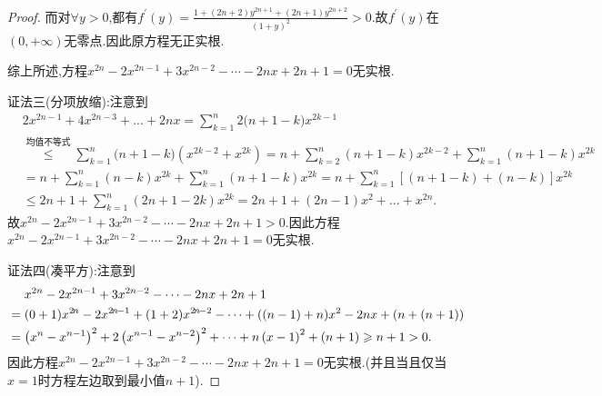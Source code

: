 \documentclass[lang=cn,newtx,10pt,scheme=chinese]{elegantbook}
\begin{document}
\begin{proof}
    而对\(\forall y > 0\),都有\(f^{\prime}(y) = \frac{1 + (2n + 2)y^{2n + 1} + (2n + 1)y^{2n + 2}}{(1 + y)^2} > 0\).故\(f^{\prime}(y)\)在\((0, +\infty)\)无零点.因此原方程无正实根.

    综上所述,方程\(x^{2n} - 2x^{2n - 1} + 3x^{2n - 2} - \cdots - 2nx + 2n + 1 = 0\)无实根.

    {\color{blue}证法三(分项放缩):}注意到
    \begin{align*}
        &2x^{2n-1}+4x^{2n-3}+...+2nx=\sum_{k=1}^n{2(n}+1-k)x^{2k-1}
        \\
        &\overset{\hyperref[note:1.1111]{\text{均值不等式}}}{\leqslant}\sum_{k=1}^n{(n}+1-k)\left( x^{2k-2}+x^{2k} \right) =n+\sum_{k=2}^n{(n+1-k)x^{2k-2}}+\sum_{k=1}^n{(n+1-k)x^{2k}}
        \\
        &=n+\sum_{k=1}^n{(n-k)x^{2k}}+\sum_{k=1}^n{(n+1-k)x^{2k}}=n+\sum_{k=1}^n{\left[ (n+1-k)+(n-k) \right] x^{2k}}
        \\
        &\leqslant 2n+1+\sum_{k=1}^n{(2n+1-2k)x^{2k}}=2n+1+(2n-1)x^2+...+x^{2n}.
    \end{align*}
    故\(x^{2n} - 2x^{2n - 1} + 3x^{2n - 2} - \cdots - 2nx + 2n + 1 > 0\).因此方程\(x^{2n} - 2x^{2n - 1} + 3x^{2n - 2} - \cdots - 2nx + 2n + 1 = 0\)无实根.

    {\color{blue}证法四(凑平方):}注意到
    \begin{align*}\label{eq:别样的凑平方技巧}
        &\,\,\,\,\,\,\,\,x^{2n}-2x^{2n-1}+3x^{2n-2}-\cdots -2nx+2n+1
\\
&=(0+1)x^{2\hskip -1pt n}-2x^{2\hskip -1pt n\hskip -1pt -1}+(1+2)x^{2\hskip -1pt n\hskip -1pt -2}-\cdots+((n-1)+n)x^2-2nx+(n+(n+1))
\\
&=\left( x^n-x^{n-1} \right) ^2+2\left( x^{n-1}-x^{n-2} \right) ^2+\cdots +n\left( x-1 \right) ^2+\left( n+1 \right) \geqslant n+1>0.
    \end{align*}
    因此方程\(x^{2n} - 2x^{2n - 1} + 3x^{2n - 2} - \cdots - 2nx + 2n + 1 = 0\)无实根.(并且当且仅当\(x = 1\)时方程左边取到最小值\(n + 1\)).
\end{proof}
\end{document}
